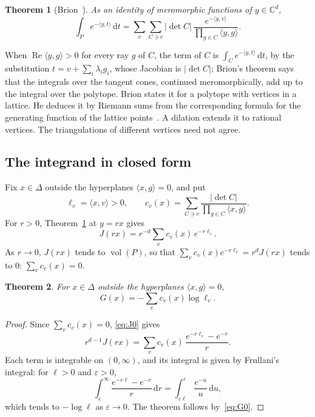\documentclass[11pt]{article}
\newtheorem{theorem}{Theorem}[section]
\theoremstyle{remark}
\newcommand{\C}{\mathbb{C}}
\newcommand{\scal}[2]{\langle #1, #2\rangle}
\newcommand{\vol}{\operatorname{vol}}
\newcommand{\dd}{\mathrm{d}}
\begin{document}
\begin{theorem}[{Brion~\cite[Th\'eor\`eme~3.2]{Brion}}]
\label{thm:brion}
As an identity of meromorphic functions of $y \in \C^d$,
\[
  \int_P e^{-\scal{y}{t}} \, \dd t
  = \sum_{v} \sum_{C \ni v} |\det C| \,
    \frac{e^{-\scal{y}{v}}}{\prod_{g \in C} \scal{y}{g}}.
\]
\end{theorem}

When $\operatorname{Re}\scal{y}{g} > 0$ for every ray $g$ of $C$, the term
of $C$ is $\int_C e^{-\scal{y}{t}} \, \dd t$, by the substitution $t = v +
\sum_i \lambda_i g_i$, whose Jacobian is $|\det C|$; Brion's theorem says
that the integrals over the tangent cones, continued meromorphically, add up
to the integral over the polytope. Brion states it for a polytope with
vertices in a lattice. He deduces it by Riemann sums from the corresponding
formula for the generating function of the lattice
points~\cite[Th\'eor\`eme~2.4]{Brion}. A dilation extends it to rational
vertices. The triangulations of different vertices need not agree.

\subsection{The integrand in closed form}
\label{sec:closed}

Fix $x \in \Delta$ outside the hyperplanes $\scal{x}{g} = 0$, and put
\[
  \ell_v = \scal{x}{v} > 0, \qquad
  c_v(x) = \sum_{C \ni v} \frac{|\det C|}{\prod_{g \in C} \scal{x}{g}}.
\]
For $r > 0$, Theorem~\ref{thm:brion} at $y = r x$ gives
\begin{equation}\label{eq:J0}
  J(r x) = r^{-d} \sum_v c_v(x) \, e^{-r \ell_v}.
\end{equation}
As $r \to 0$, $J(r x)$ tends to $\vol(P)$, so that $\sum_v c_v(x) e^{-r
\ell_v} = r^d J(r x)$ tends to $0$: $\sum_v c_v(x) = 0$.

\begin{theorem}\label{thm:G0}
For $x \in \Delta$ outside the hyperplanes $\scal{x}{g} = 0$,
\[
  G(x) = -\sum_v c_v(x) \log \ell_v.
\]
\end{theorem}

\begin{proof}
Since $\sum_v c_v(x) = 0$, \eqref{eq:J0} gives
\[
  r^{d-1} J(r x) = \sum_v c_v(x) \, \frac{e^{-r \ell_v} - e^{-r}}{r}.
\]
Each term is integrable on $(0, \infty)$, and its integral is given by
Frullani's integral: for $\ell > 0$ and $\varepsilon > 0$,
\[
  \int_\varepsilon^\infty \frac{e^{-r \ell} - e^{-r}}{r} \, \dd r
  = \int_{\varepsilon \ell}^{\varepsilon} \frac{e^{-u}}{u} \, \dd u,
\]
which tends to $-\log \ell$ as $\varepsilon \to 0$. The theorem follows
by~\eqref{eq:G0}.
\end{proof}
\end{document}
